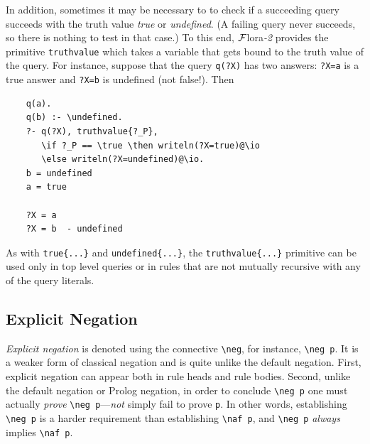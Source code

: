 \documentclass[11pt]{article}
\newcommand{\FLORA}{{\mbox{\sc ${\cal F}${lora}\rm\emph{-2}}}\xspace}
\newcommand{\FLSYSTEM}{\FLORA}
\newcommand{\bs}{\textbackslash}
\newcommand{\RULELOGNAF}{{\texttt{{\bs}naf}}\xspace}
\newcommand{\RULELOGNEG}{{\texttt{{\bs}neg}}\xspace}
\begin{document}
In addition, sometimes it may be necessary to to check if a succeeding
query succeeds with the truth value \emph{true} or
\emph{undefined}. (A failing query never succeeds, so there is nothing to
test in that case.)  To this end, \FLSYSTEM provides the primitive
\texttt{truthvalue} which takes a variable that gets bound to the truth
value of the query. For instance, suppose that the query \texttt{q(?X)} has
two answers: \texttt{?X=a} is a true answer and \texttt{?X=b} is undefined
(not false!). Then
\begin{verbatim}
    q(a).
    q(b) :- \undefined.
    ?- q(?X), truthvalue{?_P},
       \if ?_P == \true \then writeln(?X=true)@\io
       \else writeln(?X=undefined)@\io.
    b = undefined
    a = true

    ?X = a
    ?X = b  - undefined
\end{verbatim}
As with {\tt true\{...\}}  and {\tt undefined\{...\}}, the
\texttt{truthvalue\{...\}} primitive can be used only in top level queries or
in rules that are not mutually recursive with any of the query literals.

\subsection{Explicit Negation}
\label{sec-explicit-negation}

\emph{Explicit negation} is denoted using the connective {\tt \RULELOGNEG}, for
instance, {\tt \RULELOGNEG p}. It is a weaker form of classical negation and is
quite unlike the default negation. First, explicit negation can appear both
in rule heads and rule bodies. Second, unlike the default negation or
Prolog negation, in order to conclude {\tt \RULELOGNEG p} one must actually
\emph{prove} {\tt \RULELOGNEG p}---\emph{not} simply
fail to prove {\tt p}. In other words, establishing \texttt{\RULELOGNEG p}
is a harder requirement than establishing \texttt{\RULELOGNAF p},
and \texttt{\RULELOGNEG p} \emph{always} implies   \texttt{\RULELOGNAF p}.
\end{document}
